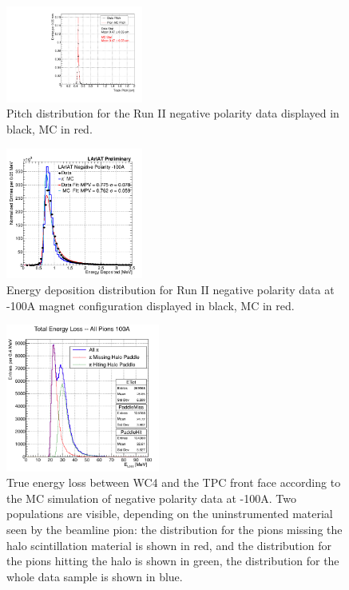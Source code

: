\documentclass[aps,prl,twocolumn,showpacs,superscriptaddress,groupedaddress]{revtex4}  %
\begin{document}
\begin{figure}
\includegraphics[width =0.4\textwidth ]{PitchPi}
\caption{\label{fig:pitch}  Pitch distribution for the Run II negative polarity data displayed in black, MC in red.}
\end{figure}
\begin{figure}
\includegraphics[width =0.4\textwidth ]{DepEnergy_Fit_v4100A.png}
\caption{\label{fig:enDep}  Energy deposition distribution for Run II negative polarity data at -100A magnet configuration displayed in black, MC in red.}
\end{figure}

\begin{figure}
\centering
\includegraphics[width=0.45\textwidth]{E_loss100A.png}
\caption{\label{fig:ELoss100A}  True energy loss between WC4 and the TPC front face according to the MC simulation of negative polarity data at -100A. Two populations are visible, depending on the uninstrumented material seen by the beamline pion: the distribution for the pions missing the halo scintillation material is shown in red, and the distribution for the pions hitting the halo is shown in green, the distribution for the whole data sample is shown in blue.  }
\end{figure}
\end{document}
